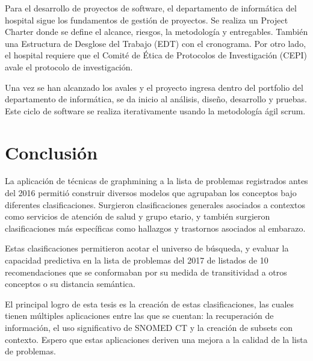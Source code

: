 Para el desarrollo de proyectos de software, el departamento de informática del hospital sigue los fundamentos de gestión de proyectos. Se realiza un Project Charter donde se define el alcance, riesgos, la metodología y entregables. También una Estructura de Desglose del Trabajo (EDT) con el cronograma. Por otro lado, el hospital requiere que el Comité de Ética de Protocolos de Investigación (CEPI) avale el protocolo de investigación. 

Una vez se han alcanzado los avales y el proyecto ingresa dentro del portfolio del departamento de informática, se da inicio al análisis, diseño, desarrollo y pruebas. Este ciclo de software se realiza iterativamente usando la metodología ágil scrum. 

\section{Conclusión}

La aplicación de técnicas de graphmining a la lista de problemas registrados antes del 2016 permitió construir diversos modelos que agrupaban los conceptos bajo diferentes clasificaciones. Surgieron  clasificaciones generales asociados a contextos como servicios de atención de salud y grupo etario, y también surgieron clasificaciones más específicas como hallazgos y trastornos asociados al embarazo.

Estas clasificaciones permitieron acotar el universo de búsqueda, y evaluar la capacidad predictiva en la lista de problemas del 2017 de listados de 10 recomendaciones que se conformaban por su medida de transitividad a otros conceptos o su distancia semántica.

El principal logro de esta tesis es la creación de estas clasificaciones, las cuales tienen múltiples aplicaciones entre las que se cuentan: la recuperación de información, el uso significativo de SNOMED CT y la creación de subsets con contexto. Espero que estas aplicaciones deriven una mejora a la calidad de la lista de problemas.
